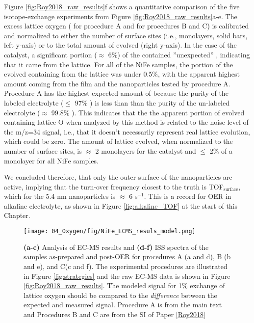 Figure \ref{fig:Roy2018_raw_results}f shows a quantitative comparison of the five isotope-exchange experiments from Figure \ref{fig:Roy2018_raw_results}a-e. The excess lattice oxygen ( for procedure A and  for procedures B and C) is calibrated and normalized to either the number of surface sites (i.e., monolayers, solid bars, left y-axis) or to the total amount of  evolved (right y-axis). In the case of the  catalyst, a significant portion ($\approx$ 6\%) of the  contained ''unexpected'' , indicating that it came from the lattice. For all of the NiFe samples, the portion of the evolved  containing  from the lattice was under 0.5\%, with the apparent highest amount coming from the film and the nanoparticles tested by procedure A. Procedure A has the highest expected amount of  because the purity of the labeled electrolyte ($\le$ 97\% ) is less than than the purity of the un-labeled electrolyte ($\approx$ 99.8\% ). This indicates that the the apparent portion of evolved  containing lattice O when analyzed by this method is related to the noise level of the m/z=34 signal, i.e., that it doesn't necessarily represent real lattice  evolution, which could be zero. The amount of lattice  evolved, when normalized to the number of surface sites, is $\approx$ 2 monolayers for the  catalyst and $\le$ 2\% of a monolayer for all NiFe samples. 

We concluded therefore, that only the outer surface of the nanoparticles are active, implying that the turn-over frequency closest to the truth is TOF$_{\text{surface}}$, which for the 5.4 nm nanoparticles is $\approx$ 6 s$^{-1}$. This is a record for OER in alkaline electrolyte, as shown in Figure \ref{fig:alkaline_TOF} at the start of this Chapter.

\begin{figure}[h!]
	\centering
	\texttt{[image: 04\_Oxygen/fig/NiFe\_ECMS\_resuls\_model.png]}
	\caption{\textbf{(a-c)} Analysis of EC-MS results and \textbf{(d-f)} ISS spectra of the samples as-prepared and post-OER for procedures A (a and d), B (b and e), and C(c and f). The experimental procedures are illustrated in Figure \ref{fig:strategies} and the raw EC-MS data is shown in Figure \ref{fig:Roy2018_raw_results}. The modeled signal for 1\% exchange of lattice oxygen should be compared to the \textit{difference} between the expected and measured  signal. Procedure A is from the main text and Procedures B and C are from the SI of Paper \ref{Roy2018}}
	\label{fig:Roy2018_model}
\end{figure}

